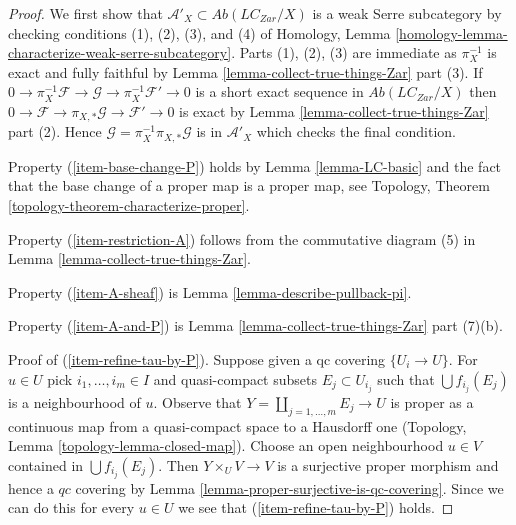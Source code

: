 \begin{proof}
We first show that $\mathcal{A}'_X \subset \textit{Ab}(\textit{LC}_{Zar}/X)$
is a weak Serre subcategory by checking conditions (1), (2), (3), and (4)
of Homology, Lemma \ref{homology-lemma-characterize-weak-serre-subcategory}.
Parts (1), (2), (3) are immediate as $\pi_X^{-1}$ is exact and
fully faithful by Lemma \ref{lemma-collect-true-things-Zar} part (3). If
$0 \to \pi_X^{-1}\mathcal{F} \to \mathcal{G} \to \pi_X^{-1}\mathcal{F}' \to 0$
is a short exact sequence in $\textit{Ab}(\textit{LC}_{Zar}/X)$
then $0 \to \mathcal{F} \to \pi_{X, *}\mathcal{G} \to \mathcal{F}' \to 0$
is exact by Lemma \ref{lemma-collect-true-things-Zar} part (2).
Hence $\mathcal{G} = \pi_X^{-1}\pi_{X, *}\mathcal{G}$ is in
$\mathcal{A}'_X$ which checks the final condition.

\medskip\noindent
Property (\ref{item-base-change-P}) holds by Lemma \ref{lemma-LC-basic}
and the fact that the base change of a proper map is a proper map, see
Topology, Theorem \ref{topology-theorem-characterize-proper}.

\medskip\noindent
Property (\ref{item-restriction-A}) follows from the commutative
diagram (5) in Lemma \ref{lemma-collect-true-things-Zar}.

\medskip\noindent
Property (\ref{item-A-sheaf}) is Lemma \ref{lemma-describe-pullback-pi}.

\medskip\noindent
Property (\ref{item-A-and-P}) is Lemma \ref{lemma-collect-true-things-Zar}
part (7)(b).

\medskip\noindent
Proof of (\ref{item-refine-tau-by-P}). Suppose given a qc covering
$\{U_i \to U\}$. For $u \in U$ pick $i_1, \ldots, i_m \in I$ and
quasi-compact subsets $E_j \subset U_{i_j}$ such that
$\bigcup f_{i_j}(E_j)$ is a neighbourhood of $u$.
Observe that $Y = \coprod_{j = 1, \ldots, m} E_j \to U$
is proper as a continuous map from a quasi-compact space
to a Hausdorff one (Topology, Lemma \ref{topology-lemma-closed-map}).
Choose an open neighbourhood $u \in V$ contained in $\bigcup f_{i_j}(E_j)$.
Then $Y \times_U V \to V$ is a surjective proper morphism and
hence a $qc$ covering by Lemma \ref{lemma-proper-surjective-is-qc-covering}.
Since we can do this for every $u \in U$ we see that
(\ref{item-refine-tau-by-P}) holds.
\end{proof}

